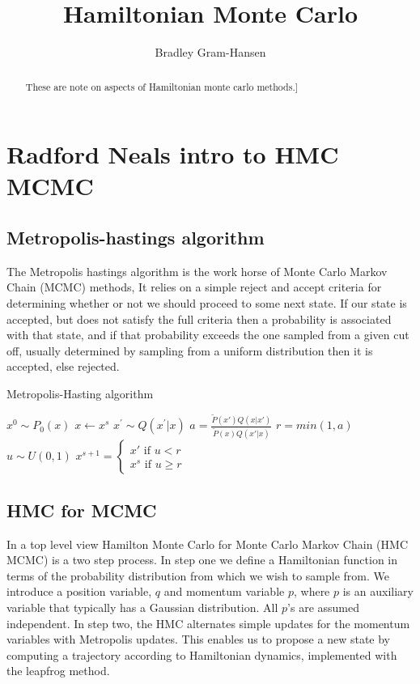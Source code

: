 \documentclass[]{report}
\title{Hamiltonian Monte Carlo}
\author{Bradley Gram-Hansen}
\begin{document}
\maketitle

\begin{abstract}
	These are note on aspects of Hamiltonian monte carlo methods.]
\end{abstract}


\section{Radford Neals intro to HMC MCMC}

\subsection{Metropolis-hastings algorithm}
The Metropolis hastings algorithm is the work horse of Monte Carlo Markov Chain (MCMC) methods, It relies on a simple reject and accept criteria for determining whether or not we should proceed to some next state. If our state is accepted, but does not satisfy the full criteria then a probability is associated with that state, and if that probability exceeds the one sampled from a given cut off, usually determined by sampling from a uniform distribution then it is accepted, else rejected. 

\begin{algorithm}
\caption{Metropolis-Hasting algorithm}
\begin{algorithmic}[1]
	\State  $x^{0} \sim P_{0}(x)$ 
		\State $ x \gets x^{s} $
		\State $ x^{'} \sim Q(x^{'}|x)$
		\State $a = \frac{\tilde{P}(x')Q(x|x')}{\tilde{P}(x)Q(x'|x)}$ 
		\State $r = min(1, a) $ 
		\State $u \sim  U(0,1)$ 
		\State $x^{s+1} = \begin{cases}
		x' \text{ if $u < r$}\\
		x^{s} \text{ if $u \geq r$}
		\end{cases}$
		\EndFor
\end{algorithmic} 
\end{algorithm}

\subsection{HMC for MCMC}

In a top level view Hamilton Monte Carlo for Monte Carlo Markov Chain (HMC MCMC) is a two step process. In step one we define a Hamiltonian function in terms of the probability distribution from which we wish to sample from. We introduce a position variable, $q$ and momentum variable $p$, where $p$ is an auxiliary variable that typically has a Gaussian distribution.  All $p$'s are assumed independent. 
In step two, the HMC alternates simple updates for the momentum variables with Metropolis updates. This enables us to propose a new state by computing a trajectory according to Hamiltonian dynamics, implemented with the leapfrog method. 
\end{document}
